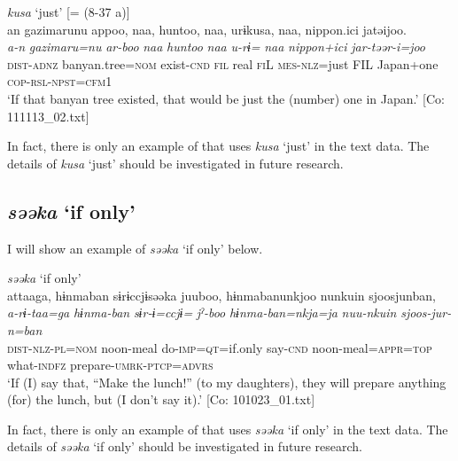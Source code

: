 \ea\label{ex:10.28}   \textit{kusa} ‘just’ [= (8-37 a)]\\
      \glll    an  gazimarunu  appoo,  naa,  huntoo,  naa,   urɨkusa,  naa,  {\textbar}nippon.ici{\textbar}  jatəijoo.\\
    \textit{a-n}  \textit{gazimaru=nu}  \textit{ar-boo}  \textit{naa}  \textit{huntoo}  \textit{naa} \textit{u-rɨ=}  \textit{naa}  \textit{nippon+ici}  \textit{jar-təər-i=joo}\\
    \textsc{dist}-\textsc{adnz}  banyan.tree=\textsc{nom}  exist-\textsc{cnd}  \textsc{fil}  real  \textsc{fi}L \textsc{mes}-\textsc{nlz}=just  FIL  Japan+one  \textsc{cop}-\textsc{rsl}-\textsc{npst}=\textsc{cfm}1\\
\glt     ‘If that banyan tree existed, that would be just the (number) one in Japan.’  [Co: 111113\_02.txt]
\z

In fact, there is only an example of  that uses \textit{kusa} ‘just’ in the text data. The details of \textit{kusa} ‘just’ should be investigated in future research.

\subsection{\textit{səəka} ‘if only’}\label{sec:10.1.8}

I will show an example of \textit{səəka} ‘if only’ below.

\ea\label{ex:10.29}   \textit{səəka} ‘if only’\\
      \glll    attaaga,  hɨnmaban  sɨrɨccjɨsəəka  juuboo,  hɨnmabanunkjoo  nunkuin  sjoosjunban,\\
    \textit{a-rɨ-taa=ga}  \textit{hɨnma-ban}  \textit{sɨr-ɨ=ccjɨ=}  \textit{jˀ-boo}  \textit{hɨnma-ban=nkja=ja}  \textit{nuu-nkuin}  \textit{sjoos-jur-n=ban}\\
    \textsc{dist}-\textsc{nlz}-\textsc{pl}=\textsc{nom}  noon-meal  do-\textsc{imp}=\textsc{qt}=if.only  say-\textsc{cnd}   noon-meal=\textsc{appr}=\textsc{top}  what-\textsc{indfz}  prepare-\textsc{umrk}-\textsc{ptcp}=\textsc{advrs}\\
\glt     ‘If (I) say that, “Make the lunch!” (to my daughters), they will prepare anything (for) the lunch, but (I don’t say it).’  [Co: 101023\_01.txt]
\z

In fact, there is only an example of  that uses \textit{səəka} ‘if only’ in the text data. The details of \textit{səəka} ‘if only’ should be investigated in future research.

